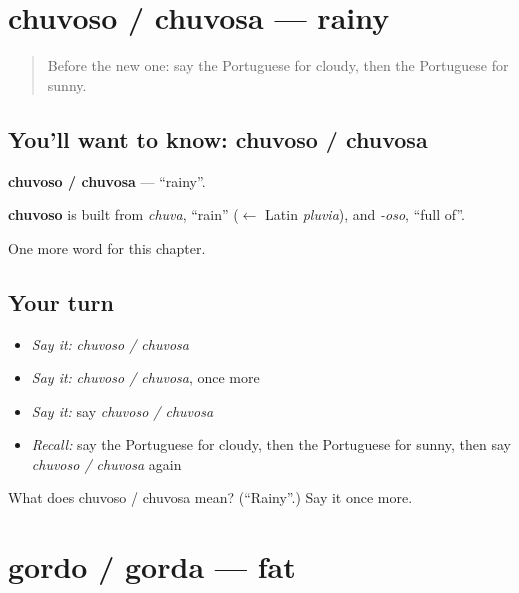 \section[chuvoso / chuvosa]{chuvoso / chuvosa — rainy}

\label{lesson:PT-C217-chuvoso-chuvosa}



\begin{quote}
Before the new one: say the Portuguese for cloudy, then the Portuguese for sunny.
\end{quote}

\subsection*{You'll want to know: chuvoso / chuvosa}
\textbf{chuvoso / chuvosa} — \textquotedblleft{}rainy\textquotedblright{}.

\begin{cousinweb}
\textbf{chuvoso} is built from \emph{chuva}, \textquotedblleft{}rain\textquotedblright{} ($\leftarrow$ Latin \emph{pluvia}), and \emph{-oso}, \textquotedblleft{}full of\textquotedblright{}.
\end{cousinweb}

\begin{grammarlens}[title={What you've built}]
One more word for this chapter.
\end{grammarlens}

\subsection*{Your turn}
\begin{itemize}
\raggedright
  \item \emph{Say it:} \emph{chuvoso / chuvosa}
  \item \emph{Say it:} \emph{chuvoso / chuvosa}, once more
  \item \emph{Say it:} say \emph{chuvoso / chuvosa}
  \item \emph{Recall:} say the Portuguese for cloudy, then the Portuguese for sunny, then say \emph{chuvoso / chuvosa} again
\end{itemize}

\begin{tcolorbox}[breakable,colback=teal!4,colframe=teal!35!black,title={Before you move on}]
What does chuvoso / chuvosa mean? (\textquotedblleft{}Rainy\textquotedblright{}.) Say it once more.
\end{tcolorbox}
\section[gordo / gorda]{gordo / gorda — fat}


